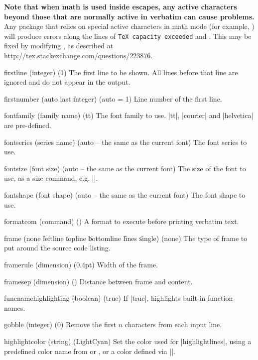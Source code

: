 \begin{optionlist}
\textbf{Note that when math is used inside escapes, any active characters beyond those that are normally active in verbatim can cause problems.}  Any package that relies on special active characters in math mode (for example, ) will produce errors along the lines of \texttt{TeX capacity exceeded} and \texttt{\string\leavevmode \string\kern \string\z@}.  This may be fixed by modifying \texttt{\string\@noligs}, as described at \url{http://tex.stackexchange.com/questions/223876}.
  \item[firstline (integer) (1)]
    The first line to be shown.
    All lines before that line are ignored and do not appear in the output.
  \item[firstnumber (auto \| last \| integer) (auto = 1)]
    Line number of the first line.
  \item[fontfamily (family name) (tt)]
    The font family to use.
    |tt|, |courier| and |helvetica| are pre-defined.
  \item[fontseries (series name) (auto \textrm{-- the same as the current font})]
    The font series to use.
  \item[fontsize (font size) (auto \textrm{-- the same as the current font})]
    The size of the font to use, as a size command, e.g. |\footnotesize|.
  \item[fontshape (font shape) (auto \textrm{-- the same as the current font})]
    The font shape to use.
  \item[formatcom (command) (\meta{none})]
    A format to execute before printing verbatim text.
  \item[frame (none \| leftline \| topline \| bottomline \| lines \| single) (none)]
    The type of frame to put around the source code listing.
  \item[framerule (dimension) (0.4pt)]
    Width of the frame.
  \item[framesep (dimension) (\cmd\fboxsep)]
    Distance between frame and content.
  \item[funcnamehighlighting (boolean) (true)] 
    If |true|, highlights built-in function names.
  \item[gobble (integer) (0)]
    Remove the first $n$ characters from each input line.

\item[highlightcolor (string) (LightCyan)]
Set the color used for |highlightlines|, using a predefined color name from  or , or a color defined via |\definecolor|.



\end{optionlist}
